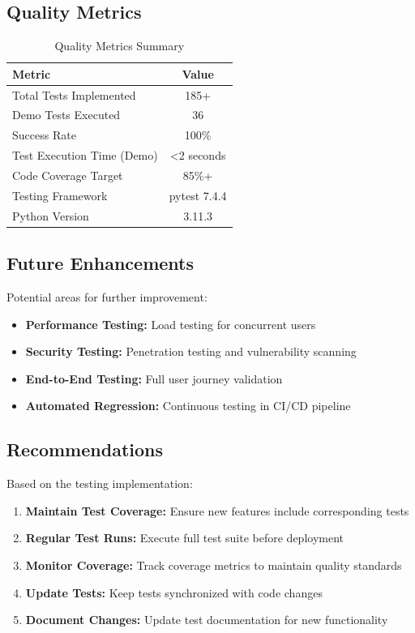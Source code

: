 \documentclass[12pt,a4paper]{article}
\begin{document}
\subsection{Quality Metrics}

\begin{table}[H]
\centering
\begin{tabular}{|l|c|}
\hline
\textbf{Metric} & \textbf{Value} \\
\hline
Total Tests Implemented & 185+ \\
Demo Tests Executed & 36 \\
Success Rate & 100\% \\
Test Execution Time (Demo) & <2 seconds \\
Code Coverage Target & 85\%+ \\
Testing Framework & pytest 7.4.4 \\
Python Version & 3.11.3 \\
\hline
\end{tabular}
\caption{Quality Metrics Summary}
\end{table}

\subsection{Future Enhancements}

Potential areas for further improvement:

\begin{itemize}
    \item \textbf{Performance Testing:} Load testing for concurrent users
    \item \textbf{Security Testing:} Penetration testing and vulnerability scanning
    \item \textbf{End-to-End Testing:} Full user journey validation
    \item \textbf{Automated Regression:} Continuous testing in CI/CD pipeline
\end{itemize}

\subsection{Recommendations}

Based on the testing implementation:

\begin{enumerate}
    \item \textbf{Maintain Test Coverage:} Ensure new features include corresponding tests
    \item \textbf{Regular Test Runs:} Execute full test suite before deployment
    \item \textbf{Monitor Coverage:} Track coverage metrics to maintain quality standards
    \item \textbf{Update Tests:} Keep tests synchronized with code changes
    \item \textbf{Document Changes:} Update test documentation for new functionality
\end{enumerate}
\end{document}
